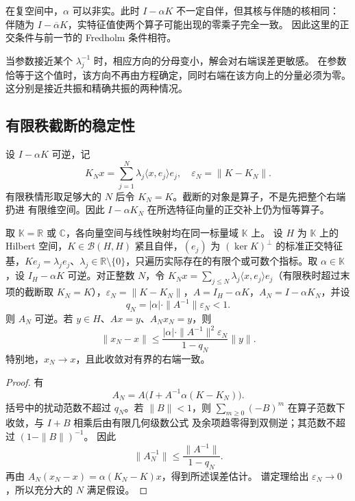在复空间中，\(\alpha\) 可以非实。此时 \(I-\alpha K\) 不一定自伴，但其核与伴随的核相同：
伴随为 \(I-\overline\alpha K\)，实特征值使两个算子可能出现的零乘子完全一致。
因此这里的正交条件与前一节的 Fredholm 条件相符。

\ProseParagraphBreak

当参数接近某个 \(\lambda_j^{-1}\) 时，相应方向的分母变小，解会对右端误差更敏感。
在参数恰等于这个值时，该方向不再由方程确定，同时右端在该方向上的分量必须为零。
这分别是接近共振和精确共振的两种情况。

\subsection{有限秩截断的稳定性}
\label{b1:subsec:C10502}

设 \(I-\alpha K\) 可逆，记
\[
 K_Nx=\sum_{j=1}^N\lambda_j\langle x,e_j\rangle e_j,\quad
 \varepsilon_N=\|K-K_N\|.
\]
有限秩情形取足够大的 \(N\) 后令 \(K_N=K\)。截断的对象是算子，不是先把整个右端扔进
有限维空间。因此 \(I-\alpha K_N\) 在所选特征向量的正交补上仍为恒等算子。

\begin{proposition}\label{b1:prop:C1-spectral-truncation}
取 \(\mathbb K=\mathbb R\) 或 \(\mathbb C\)，各向量空间与线性映射均在同一标量域 \(\mathbb K\) 上。
设 \(H\) 为 \(\mathbb K\) 上的 Hilbert 空间，\(K\in\mathcal B(H,H)\) 紧且自伴，\((e_j)\) 为 \((\ker K)^\perp\) 的标准正交特征基，\(Ke_j=\lambda_je_j\)、\(\lambda_j\in\mathbb R\setminus\{0\}\)，只遍历实际存在的有限个或可数个指标。取 \(\alpha\in\mathbb K\)，设 \(I_H-\alpha K\) 可逆。对正整数 \(N\)，令 \(K_Nx=\sum_{j\le N}\lambda_j\langle x,e_j\rangle e_j\)（有限秩时超过末项的截断取 \(K_N=K\)），\(\varepsilon_N=\|K-K_N\|\)，\(A=I_H-\alpha K\)，\(A_N=I-\alpha K_N\)，并设
\[
 q_N=|\alpha|\cdot\|A^{-1}\|\varepsilon_N<1.
\]
则 \(A_N\) 可逆。若 \(y\in H\)、\(Ax=y\)、\(A_Nx_N=y\)，则
\[
 \|x_N-x\|\leq
 \frac{|\alpha|\cdot\|A^{-1}\|^2\varepsilon_N}{1-q_N}\|y\|.
\]
特别地，\(x_N\to x\)，且此收敛对有界的右端一致。
\end{proposition}
\begin{proof}
有
\[
 A_N=A\bigl(I+A^{-1}\alpha(K-K_N)\bigr).
\]
括号中的扰动范数不超过 \(q_N\)。若 \(\|B\|<1\)，则
\(\sum_{m\geq0}(-B)^m\) 在算子范数下收敛，与 \(I+B\) 相乘后由有限几何级数公式
及余项趋零得到双侧逆；其范数不超过 \((1-\|B\|)^{-1}\)。
因此
\[
 \|A_N^{-1}\|\leq\frac{\|A^{-1}\|}{1-q_N}.
\]
再由 \(A_N(x_N-x)=\alpha(K_N-K)x\)，得到所述误差估计。
谱定理给出 \(\varepsilon_N\to0\)，所以充分大的 \(N\) 满足假设。
\end{proof}

